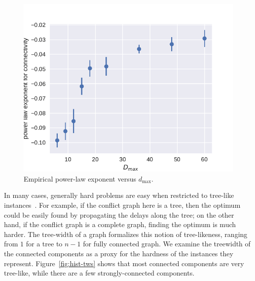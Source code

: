 \begin{figure}[h]
\includegraphics[width=0.95\columnwidth]{pics/instances/connectivity_pl.pdf}
\caption[Power-law exponent vs. $d_{\max}$]{Empirical power-law exponent versus $d_{\max}$.}
\label{fig:exponent-vs-dmax}
\end{figure}

In many cases, generally hard problems are easy when restricted to tree-like instances~\cite{bertele1972, halin1976s}.
For example, if the conflict graph here is a tree, then the optimum could be easily found by propagating the delays along the tree;
on the other hand, if the conflict graph is a complete graph, finding the optimum is much harder.
The tree-width of a graph formalizes this notion of tree-likeness, ranging from $1$ for a tree to $n-1$ for fully connected graph.
We examine the treewidth of the connected components as a proxy for the hardness of the instances they represent.
Figure~\ref{fig:hist-tws} shows that most connected components are very tree-like, while there are a few strongly-connected components.

